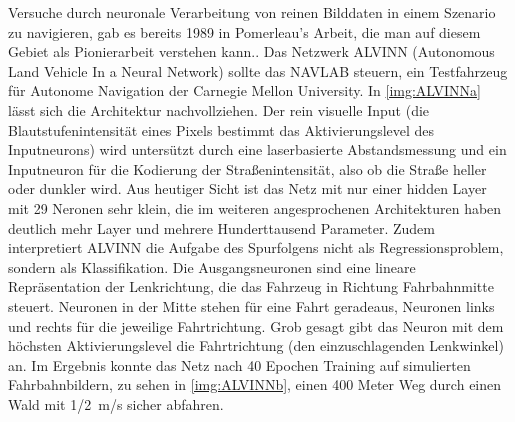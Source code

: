 Versuche durch neuronale Verarbeitung von reinen Bilddaten in einem Szenario zu navigieren, gab es bereits 1989 in Pomerleau's Arbeit, die man auf diesem Gebiet als Pionierarbeit verstehen kann.\cite{pomerleau1989alvinn}.
Das Netzwerk ALVINN (Autonomous Land Vehicle In a Neural Network) sollte das NAVLAB steuern, ein Testfahrzeug für Autonome Navigation der Carnegie Mellon University.
In \ref{img:ALVINNa} lässt sich die Architektur nachvollziehen. 
Der rein visuelle Input (die Blautstufenintensität eines Pixels bestimmt das Aktivierungslevel des Inputneurons) wird untersützt durch eine laserbasierte Abstandsmessung und ein Inputneuron für die Kodierung der \glqq Straßenintensität\grqq{}, also ob die Straße heller oder dunkler wird.
Aus heutiger Sicht ist das Netz mit nur einer hidden Layer mit 29 Neronen sehr klein, die im weiteren angesprochenen Architekturen haben deutlich mehr Layer und mehrere Hunderttausend Parameter. 
Zudem interpretiert ALVINN die Aufgabe des Spurfolgens nicht als Regressionsproblem, sondern als Klassifikation. Die Ausgangsneuronen sind eine lineare Repräsentation der Lenkrichtung, die das Fahrzeug in Richtung Fahrbahnmitte steuert. Neuronen in der Mitte stehen für eine Fahrt geradeaus, Neuronen links und rechts für die jeweilige Fahrtrichtung.
Grob gesagt gibt das Neuron mit dem höchsten Aktivierungslevel die Fahrtrichtung (den einzuschlagenden Lenkwinkel) an.
Im Ergebnis konnte das Netz nach 40 Epochen Training auf simulierten Fahrbahnbildern, zu sehen in \ref{img:ALVINNb}, einen 400 Meter Weg durch einen Wald mit \SI{1/2}{\meter/\second} sicher abfahren.


